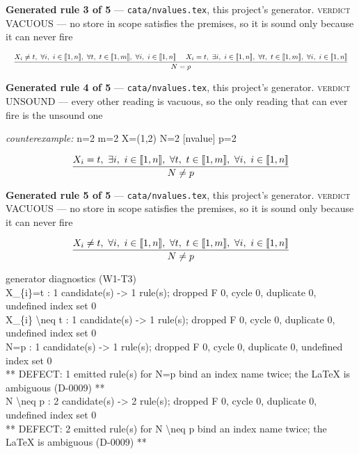 \documentclass[10pt,a4paper]{article}
\newcommand{\diag}[1]{{\small\itshape\raggedright #1\par}}
\newcommand{\rulebox}[1]{%
  \[\resizebox{\ifdim\width>\linewidth\linewidth\else\width\fi}{!}%
    {$\displaystyle #1$}\]}
\begin{document}
{\small\textbf{Generated rule 3 of 5} --- \texttt{cata/nvalues.tex}, this project's generator. \textsc{verdict} VACUOUS --- no store in scope satisfies the premises, so it is sound only because it can never fire\par}
\rulebox{\frac{X_{i} \neq t,~\forall i,~i \in \llbracket1,n\rrbracket,~\forall t,~t \in \llbracket1,m\rrbracket,~\forall i,~i \in \llbracket1,n\rrbracket~~~~X_{i}=t,~\exists i,~i \in \llbracket1,n\rrbracket,~\forall t,~t \in \llbracket1,m\rrbracket,~\forall i,~i \in \llbracket1,n\rrbracket}{N=p}}

{\small\textbf{Generated rule 4 of 5} --- \texttt{cata/nvalues.tex}, this project's generator. \textsc{verdict} UNSOUND --- every other reading is vacuous, so the only reading that can ever fire is the unsound one\par}
{\small\textit{counterexample:} n=2 m=2 X=(1,2) N=2 [nvalue] p=2\par}
\rulebox{\frac{X_{i}=t,~\exists i,~i \in \llbracket1,n\rrbracket,~\forall t,~t \in \llbracket1,m\rrbracket,~\forall i,~i \in \llbracket1,n\rrbracket}{N \neq p}}

{\small\textbf{Generated rule 5 of 5} --- \texttt{cata/nvalues.tex}, this project's generator. \textsc{verdict} VACUOUS --- no store in scope satisfies the premises, so it is sound only because it can never fire\par}
\rulebox{\frac{X_{i} \neq t,~\forall i,~i \in \llbracket1,n\rrbracket,~\forall t,~t \in \llbracket1,m\rrbracket,~\forall i,~i \in \llbracket1,n\rrbracket}{N \neq p}}

\diag{generator diagnostics (W1-T3)\\{} X\_\{i\}=t : 1 candidate(s) -> 1 rule(s); dropped F 0, cycle 0, duplicate 0, undefined index set 0\\{} X\_\{i\} \textbackslash{}neq t : 1 candidate(s) -> 1 rule(s); dropped F 0, cycle 0, duplicate 0, undefined index set 0\\{} N=p : 1 candidate(s) -> 1 rule(s); dropped F 0, cycle 0, duplicate 0, undefined index set 0\\{}   ** DEFECT: 1 emitted rule(s) for N=p bind an index name twice; the LaTeX is ambiguous (D-0009) **\\{} N \textbackslash{}neq p : 2 candidate(s) -> 2 rule(s); dropped F 0, cycle 0, duplicate 0, undefined index set 0\\{}   ** DEFECT: 2 emitted rule(s) for N \textbackslash{}neq p bind an index name twice; the LaTeX is ambiguous (D-0009) **}
\end{document}
